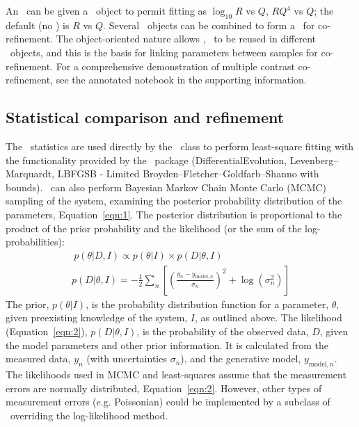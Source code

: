 \documentclass[pdf,preprint]{iucr}
\begin{document}
An \Objective\ can be given a \Transform\ object to permit fitting as $\log_{10} R$ vs $Q$, $RQ^4$ vs $Q$; the default (no \Transform) is $R$ vs $Q$. Several \Objective\ objects can be combined to form a \GlobalObjective\ for co-refinement. The object-oriented nature allows \Parameter, \Component\ to be reused in different \Objective\ objects, and this is the basis for linking parameters between samples for co-refinement. For a comprehensive demonstration of multiple contrast co-refinement, see the annotated notebook in the supporting information.

\subsection{Statistical comparison and refinement}

The \Objective\ statistics are used directly by the \CurveFitter\ class to perform least-square fitting with the functionality provided by the \SciPy\ package (DifferentialEvolution, Levenberg--Marquardt, LBFGSB - Limited Broyden--Fletcher--Goldfarb--Shanno with bounds).
\CurveFitter\ can also perform Bayesian Markov Chain Monte Carlo (MCMC) sampling of the system, examining the posterior probability distribution of the parameters, Equation~\ref{eqn:1}. The posterior distribution is proportional to the product of the prior probability and the likelihood (or the sum of the log-probabilities):
%
\begin{gather} 
\label{eqn:1}\ p(\theta | D, I) \propto p(\theta | I)\times p(D | \theta, I)\\
p(D | \theta, I) = -\frac{1}{2} \sum_n \left[\left(\frac{y_n - y_{\mathrm{model},n}} {\sigma_n}\right)^2 + \log(\sigma_n^2)\right]\label{eqn:2}
\end{gather}
%
The prior, $p(\theta | I)$, is the probability distribution function for a parameter, $\theta$, given preexisting knowledge of the system, $I$, as outlined above.
The likelihood (Equation~\ref{eqn:2}), $p(D | \theta, I)$, is the probability of the observed data, $D$, given the model parameters and other prior information. It is calculated from the measured data, $y_n$ (with uncertainties $\sigma_n$), and the generative model, $y_{\mathrm{model},n}$. The likelihoods used in MCMC and least-squares assume that the measurement errors are normally distributed, Equation~\ref{eqn:2}. However, other types of measurement errors (e.g. Poissonian) could be implemented by a subclass of \Objective\ overriding the log-likelihood method.
\end{document}
